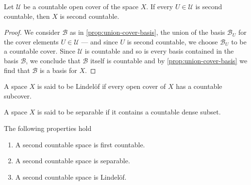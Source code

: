 \begin{corollary}
\label{cor:second-countable-out-of-cover}
Let \(\mathcal U\) be a countable open cover of the space \(X\). If every \(U
\in \mathcal U\) is second countable, then \(X\) is second countable.
\end{corollary}

\begin{proof}
We consider \(\mathcal B\) as in \cref{prop:union-cover-basis}, the union of the
basis \(\mathcal B_U\) for the cover elements \(U \in \mathcal U\) --- and since
\(U\) is second countable, we choose \(\mathcal B_U\) to be a countable
cover. Since \(\mathcal U\) is countable and so is every basis contained in the
basis \(\mathcal B\), we conclude that \(\mathcal B\) itself is countable and by
\cref{prop:union-cover-basis} we find that \(\mathcal B\) is a basis for \(X\).
\end{proof}

\begin{definition}
  A space \(X\) is said to be Lindelöf if every open cover of \(X\) has a
  countable subcover.
\end{definition}

\begin{definition}
  A space \(X\) is said to be separable if it contains a countable dense subset.
\end{definition}

\begin{proposition}
  \label{prop: second countable properties}
  The following properties hold
  \begin{enumerate}[(SC1)]
    \item A second countable space is first countable.
    \item A second countable space is separable.
    \item A second countable space is Lindelöf.
  \end{enumerate}
\end{proposition}

